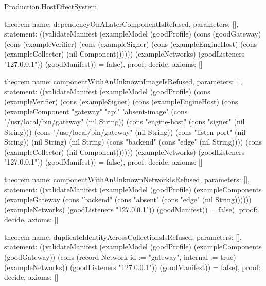 \begin{lexlean}{Production.HostEffectSystem}
\begin{semanticmodule}
theorem{
  name: dependencyOnALaterComponentIsRefused,
  parameters: [],
  statement: ((validateManifest (exampleModel (goodProfile) (cons (goodGateway) (cons (exampleVerifier) (cons (exampleSigner) (cons (exampleEngineHost) (cons (exampleCollector) (nil Component)))))) (exampleNetworks) (goodListeners "127.0.0.1")) (goodManifest)) = false),
  proof: decide{},
  axioms: []
}

theorem{
  name: componentWithAnUnknownImageIsRefused,
  parameters: [],
  statement: ((validateManifest (exampleModel (goodProfile) (cons (exampleVerifier) (cons (exampleSigner) (cons (exampleEngineHost) (cons (exampleComponent "gateway" "api" "absent-image" (cons "/usr/local/bin/gateway" (nil String)) (cons "engine-host" (cons "signer" (nil String))) (cons "/usr/local/bin/gateway" (nil String)) (cons "listen-port" (nil String)) (nil String) (nil String) (cons "backend" (cons "edge" (nil String)))) (cons (exampleCollector) (nil Component)))))) (exampleNetworks) (goodListeners "127.0.0.1")) (goodManifest)) = false),
  proof: decide{},
  axioms: []
}

theorem{
  name: componentWithAnUnknownNetworkIsRefused,
  parameters: [],
  statement: ((validateManifest (exampleModel (goodProfile) (exampleComponents (exampleGateway (cons "backend" (cons "absent" (cons "edge" (nil String)))))) (exampleNetworks) (goodListeners "127.0.0.1")) (goodManifest)) = false),
  proof: decide{},
  axioms: []
}

theorem{
  name: duplicateIdentityAcrossCollectionsIsRefused,
  parameters: [],
  statement: ((validateManifest (exampleModel (goodProfile) (exampleComponents (goodGateway)) (cons (record Network {id := "gateway", internal := true}) (exampleNetworks)) (goodListeners "127.0.0.1")) (goodManifest)) = false),
  proof: decide{},
  axioms: []
}
\end{semanticmodule}
\end{lexlean}

